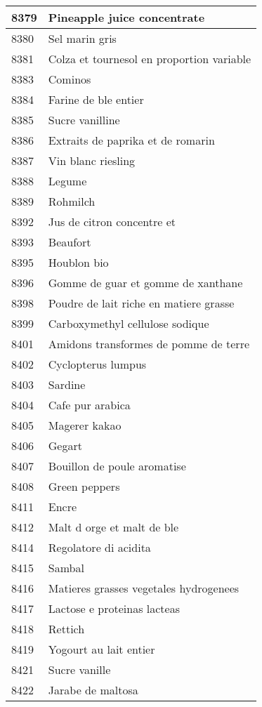 \begin{longtable}{|l|l|}
8379 & Pineapple juice concentrate \\ \hline 
8380 & Sel marin gris \\ \hline 
8381 & Colza et tournesol en proportion variable \\ \hline 
8383 & Cominos \\ \hline 
8384 & Farine de ble entier \\ \hline 
8385 & Sucre vanilline \\ \hline 
8386 & Extraits de paprika et de romarin \\ \hline 
8387 & Vin blanc riesling \\ \hline 
8388 & Legume \\ \hline 
8389 & Rohmilch \\ \hline 
8392 & Jus de citron concentre et \\ \hline 
8393 & Beaufort \\ \hline 
8395 & Houblon bio \\ \hline 
8396 & Gomme de guar et gomme de xanthane \\ \hline 
8398 & Poudre de lait riche en matiere grasse \\ \hline 
8399 & Carboxymethyl cellulose sodique \\ \hline 
8401 & Amidons transformes de pomme de terre \\ \hline 
8402 & Cyclopterus lumpus \\ \hline 
8403 & Sardine \\ \hline 
8404 & Cafe pur arabica \\ \hline 
8405 & Magerer kakao \\ \hline 
8406 & Gegart \\ \hline 
8407 & Bouillon de poule aromatise \\ \hline 
8408 & Green peppers \\ \hline 
8411 & Encre \\ \hline 
8412 & Malt d orge et malt de ble \\ \hline 
8414 & Regolatore di acidita \\ \hline 
8415 & Sambal \\ \hline 
8416 & Matieres grasses vegetales hydrogenees \\ \hline 
8417 & Lactose e proteinas lacteas \\ \hline 
8418 & Rettich \\ \hline 
8419 & Yogourt au lait entier \\ \hline 
8421 & Sucre vanille \\ \hline 
8422 & Jarabe de maltosa \\ \hline 

\end{longtable}

